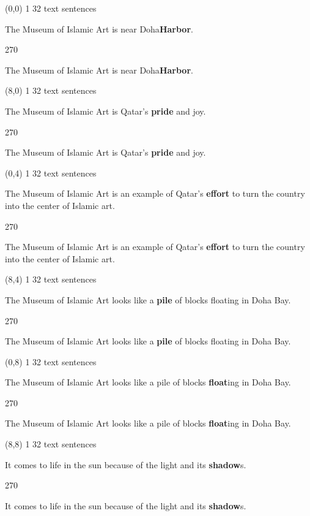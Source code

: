 \documentclass[a4paper]{article}
\newenvironment{itemize*}%
{\begin{itemize}%
 \setlength{\itemsep}{0.5cm}%
 \setlength{\parsep}{0pt}%
 \setlength{\parskip}{0pt}}%
{\end{itemize}}
\newcommand{\mycard}[3]{%
	\small #1 #2
	\par
	\parbox[t][6.8cm][c]{9.5cm}{%
	\par
	\myleft{#3}
	\par
	\myright{#3}
	}
}
\newcommand{\myleft}[1]{%
	\begin{sideways}
	\hspace*{-0.9cm}
		\parbox[t][2.7cm][t]{6.5cm}{%
		\large #1
		}
	\end{sideways}
}
\newcommand{\myright}[1]{%
	\hspace*{6.5cm}
	\begin{turn}{270}
	\hspace*{-7.1cm}
		\parbox[t][2.7cm][t]{6.5cm}{%
		\large #1
		}
	\end{turn}
}
\begin{document}
\begin{textblock}{8}(0,0)
\mycard{1}{32 text sentences}{
\begin{itemize*}
\item The Museum of Islamic Art is near Doha\textbf{Harbor}.
\end{itemize*}
}
\end{textblock}

\begin{textblock}{8}(8,0)
\mycard{1}{32 text sentences}{
\begin{itemize*}
\item The Museum of Islamic Art is Qatar's \textbf{pride} and joy.
\end{itemize*}
}
\end{textblock}

\begin{textblock}{8}(0,4)
\mycard{1}{32 text sentences}{
\begin{itemize*}
\item The Museum of Islamic Art is an example of Qatar's \textbf{effort} to turn the country into the center of Islamic art.
\end{itemize*}
}
\end{textblock}

\begin{textblock}{8}(8,4)
\mycard{1}{32 text sentences}{
\begin{itemize*}
\item The Museum of Islamic Art looks like a \textbf{pile} of blocks floating in Doha Bay.
\end{itemize*}
}
\end{textblock}

\begin{textblock}{8}(0,8)
\mycard{1}{32 text sentences}{
\begin{itemize*}
\item The Museum of Islamic Art looks like a pile of blocks \textbf{float}ing in Doha Bay.
\end{itemize*}
}
\end{textblock}

\begin{textblock}{8}(8,8)
\mycard{1}{32 text sentences}{
\begin{itemize*}
\item It comes to life in the sun because of the light and its \textbf{shadow}s.
\end{itemize*}
}
\end{textblock}
\end{document}
